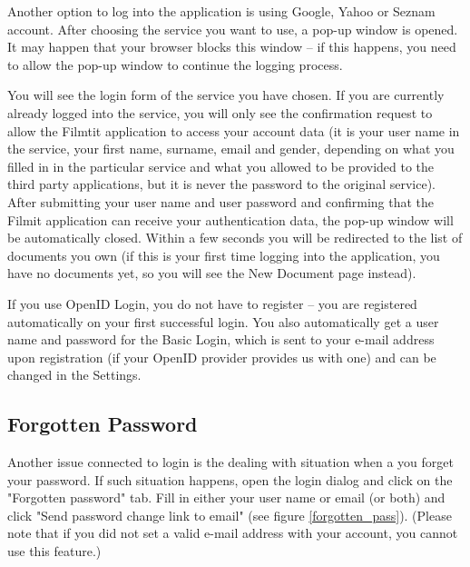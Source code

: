 Another option to log into the application is using Google, Yahoo or Seznam account. After choosing the service you want to use, a pop-up window is opened. It may happen that your browser blocks this window -- if this happens, you need to allow the pop-up window to continue the logging process.

You will see the login form of the service you have chosen. If you are currently already logged into the service, you will only see the confirmation request to allow the Filmtit application to access your account data (it is your user name in the service, your first name, surname, email and gender, depending on what you filled in in the particular service and what you allowed to be provided to the third party applications, but it is never the password to the original service).  After submitting your user name and user password and confirming that the Filmit application can receive your authentication data, the pop-up window will be automatically closed. Within a few seconds you will be redirected to the list of documents you own (if this is your first time logging into the application, you have no documents yet, so you will see the New Document page instead).

If you use OpenID Login, you do not have to register -- you are registered automatically on your first successful login. You also automatically get a user name and password for the Basic Login, which is sent to your e-mail address upon registration (if your OpenID provider provides us with one) and can be changed in the Settings.

\subsection{Forgotten Password}

Another issue connected to login is the dealing with situation when a you forget your password. If such situation happens, open the login dialog and click on the "Forgotten password" tab. Fill in either your user name or email (or both) and click "Send password change link to email" (see figure \ref{forgotten_pass}). (Please note that if you did not set a valid e-mail address with your account, you cannot use this feature.)

